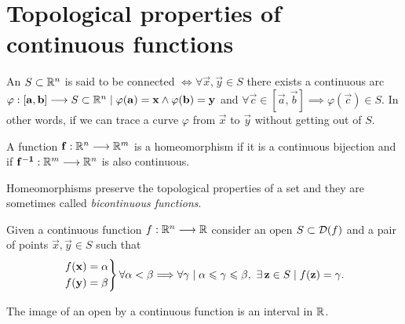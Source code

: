 \section{Topological properties of continuous functions}

\begin{defn}\label{def:connected-set}
    An  $S\subset\Rtn$ is said to be connected $\iff\forall\vec{x}, \vec{y}\in S$ there exists a 
        continuous arc $\appl{\varphi}{[\vec{a}, \vec{b}]}{S\subset\Rtn}\st\varphi(\vec{a}) = \vec{x}\land\varphi(\vec{b})
        = \vec{y}$ and $\forall\vec{c}\in [\vec{a}, \vec{b}]\implies\varphi(\vec{c})\in S$. In other words, if we can trace
        a curve $\varphi$ from $\vec{x}$ to $\vec{y}$ without getting out of $S$.
\end{defn}

\begin{defn}[Homeomorphism]
    A function $\appl{\vec{f}}{\Rtn}{\R^m}$ is a homeomorphism if it is a continuous bijection and if 
    $\appl{\vec{\invers{f}}}{\R^m}{\Rtn}$ is also continuous.
\end{defn}

\begin{remark}
    Homeomorphisms preserve the topological properties of a set and they are sometimes called \textit{bicontinuous functions}.
\end{remark}

\begin{theorem}
    Given a continuous function $\appl{f}{\Rtn}{\R}$ consider an open  $S\subset\dom{f}$ and a
    pair of points $\vec{x}, \vec{y}\in S$ such that
    \begin{equation}
        \begin{rcases}
            f(\vec{x}) = \vec{\alpha} \\
            f(\vec{y}) = \vec{\beta}
        \end{rcases}\forall\vec{\alpha} < \vec{\beta}\implies\forall\vec{\gamma}\st\vec{\alpha}\leq\vec{\gamma}\leq\vec{\beta},\ \exists\vec{z}\in S\st 
    f(\vec{z}) = \vec{\gamma}.
    \end{equation}
\end{theorem}

\begin{theorem}
    The image of an open  by a continuous function is an interval in $\R$.
\end{theorem}

